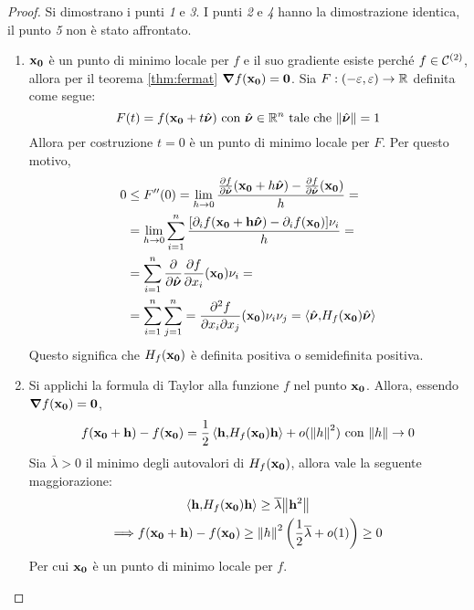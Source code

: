\begin{proof}
    Si dimostrano i punti \textit{1} e \textit{3}. I punti \textit{2} e \textit{4} hanno la dimostrazione identica, il punto \textit{5} non è stato affrontato.
    \begin{enumerate}
        \item $\vb{x_0}$ è un punto di minimo locale per $f$ e il suo gradiente esiste perché $f\in\mathcal{C}^{(2)}$, allora per il teorema \ref{thm:fermat} $\grad f(\vb{x_0}) = \vb{0}$. Sia $F:(-\varepsilon,\varepsilon)\to \mathbb{R}$ definita come segue:
        $$
            F(t)=f(\vb{x_0}+t\hat{\bm\nu})\text{ con } \hat{\bm\nu} \in \mathbb{R}^n\text{ tale che } \norm{\hat{\bm\nu}}=1
        $$
        Allora per costruzione $t=0$ è un punto di minimo locale per $F$. Per questo motivo,
        \begin{align*}
            0&\leq F''(0)=\lim_{h\to 0}\frac{\frac{\partial f}{\partial \hat{\bm\nu}}(\vb{x_0}+h\hat{\bm\nu})-\frac{\partial f}{\partial \hat{\bm\nu}}(\vb{x_0})}{h}=\\
            &=\lim_{h\to 0}\sum_{i=1}^n\frac{[\partial_i f(\vb{x_0 + h\hat{\bm\nu}})-\partial_i f(\vb{x_0})]\nu_i}{h}=\\
            &=\sum_{i=1}^{n}\frac{\partial}{\partial \hat{\bm\nu}}\frac{\partial f}{\partial x_i}(\vb{x_0})\nu_i=\\
            &=\sum_{i=1}^n\sum_{j=1}^{n}=\frac{\partial^2 f}{\partial x_i \partial x_j}(\vb{x_0})\nu_i\nu_j=\left\langle\hat{\bm\nu}{,}H_f(\vb{x_0})\hat{\bm\nu}\right\rangle
        \end{align*}
        Questo significa che $H_f(\vb{x_0})$ è definita positiva o semidefinita positiva.
        \addtocounter{enumi}{1}
        \item Si applichi la formula di Taylor alla funzione $f$ nel punto $\vb{x_0}$. Allora, essendo $\grad f(\vb{x_0})=\vb{0}$,
        $$
            f(\vb{x_0}+\vb{h})-f(\vb{x_0}) = \frac{1}{2}\left\langle\vb{h}{,}H_f(\vb{x_0})\vb{h}\right\rangle+o(\norm{h}^2) \text{ con } \norm{h}\to 0
        $$
        Sia $\overline{\lambda}>0$ il minimo degli autovalori di $H_f(\vb{x_0})$, allora vale la seguente maggiorazione:
        \begin{gather*} 
            \left\langle\vb{h}{,}H_f(\vb{x_0})\vb{h}\right\rangle\geq \overline{\lambda}\norm{\vb{h}^2}\\
            \Longrightarrow f(\vb{x_0}+\vb{h})-f(\vb{x_0})\geq \norm{h}^2\left(\frac{1}{2}\overline{\lambda}+o(1)\right)\geq 0
        \end{gather*}
        Per cui $\vb{x_0}$ è un punto di minimo locale per $f$.
    \end{enumerate}
\end{proof}